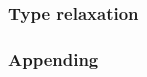 \def\Subsubsection#1{\subsubsection{#1}}

\Subsubsection{Type relaxation}

\Subsubsection{Appending}
